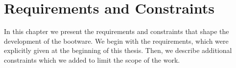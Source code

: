 \chapter{Requirements and Constraints}
\label{requirements}

In this chapter we present the requirements and constraints that shape the development of the bootware.
We begin with the requirements, which were explicitly given at the beginning of this thesis.
Then, we describe additional constraints which we added to limit the scope of the work.



